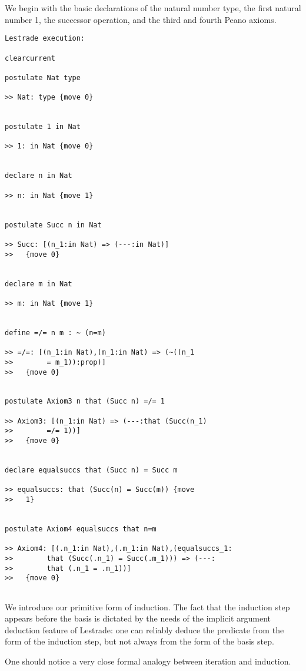 \documentclass[12pt]{article}
\begin{document}
We begin with the basic declarations of the natural number type, the first natural number 1, the successor operation, and the third and fourth Peano axioms.

\begin{verbatim}Lestrade execution:

clearcurrent

postulate Nat type

>> Nat: type {move 0}


postulate 1 in Nat

>> 1: in Nat {move 0}


declare n in Nat

>> n: in Nat {move 1}


postulate Succ n in Nat

>> Succ: [(n_1:in Nat) => (---:in Nat)]
>>   {move 0}


declare m in Nat

>> m: in Nat {move 1}


define =/= n m : ~ (n=m)

>> =/=: [(n_1:in Nat),(m_1:in Nat) => (~((n_1 
>>        = m_1)):prop)]
>>   {move 0}


postulate Axiom3 n that (Succ n) =/= 1

>> Axiom3: [(n_1:in Nat) => (---:that (Succ(n_1) 
>>        =/= 1))]
>>   {move 0}


declare equalsuccs that (Succ n) = Succ m

>> equalsuccs: that (Succ(n) = Succ(m)) {move 
>>   1}


postulate Axiom4 equalsuccs that n=m

>> Axiom4: [(.n_1:in Nat),(.m_1:in Nat),(equalsuccs_1:
>>        that (Succ(.n_1) = Succ(.m_1))) => (---:
>>        that (.n_1 = .m_1))]
>>   {move 0}


\end{verbatim}

We introduce our primitive form of induction.  The fact that the induction step appears before the basis
is dictated by the needs of the implicit argument deduction feature of Lestrade:  one can reliably deduce the 
predicate from the form of the induction step, but not always from the form of the basis step.

One should notice a very close formal analogy between iteration and induction.
\end{document}
